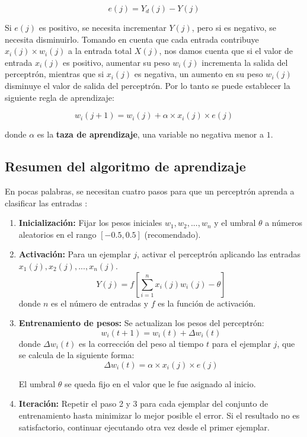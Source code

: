 \[ e(j) = Y_d(j)-Y(j)\]
\parencite[171]{Nengnevitsky2005}

Si $e(j)$ es positivo, se necesita incrementar $Y(j)$, pero si es negativo, se necesita disminuirlo. Tomando en cuenta que cada entrada contribuye \(x_i(j) \times w_i(j)\) a la entrada total $X(j)$, nos damos cuenta que si el valor de entrada $x_i(j)$ es positivo, aumentar su peso $w_i(j)$ incrementa la salida del perceptrón, mientras que si $x_i(j)$ es negativa, un aumento en su peso $w_i(j)$ disminuye el valor de salida del perceptrón. Por lo tanto se puede establecer la siguiente regla de aprendizaje:

\[w_i(j+1) = w_i(j) + \alpha \times x_i(j) \times e(j) \]
\parencite[171]{Nengnevitsky2005}

\noindent donde $\alpha$ es la \textbf{taza de aprendizaje}, una variable no negativa menor a $1$.

\subsection{Resumen del algoritmo de aprendizaje}

\noindent En pocas palabras, se necesitan cuatro pasos para que un perceptrón aprenda a clasificar las entradas \parencite[172]{Nengnevitsky2005}:\par

\begin{enumerate}
  \item \textbf{Inicialización:} Fijar los pesos iniciales \(w_1, w_2, ..., w_n\) y el umbral $\theta$ a números aleatorios en el rango $[-0.5, 0.5]$ (recomendado).
  
  \item \textbf{Activación:} Para un ejemplar $j$, activar el perceptrón aplicando las entradas\\ \(x_1(j), x_2(j), ..., x_n(j)\).
  \[Y(j) = f\left[\sum_{i=1}^{n}x_i(j)w_i(j)-\theta\right]\]
  donde $n$ es el número de entradas y $f$ es la función de activación.
  
  \item \textbf{Entrenamiento de pesos:} Se actualizan los pesos del perceptrón:
  \[w_i(t+1)=w_i(t)+\Delta w_i(t)\]
  donde \(\Delta w_i(t)\) es la corrección del peso al tiempo $t$ para el ejemplar $j$, que se calcula de la siguiente forma:
  \[\Delta w_i(t)=\alpha \times x_i(j) \times e(j)\]
  
  El umbral $\theta$ se queda fijo en el valor que le fue asignado al inicio.
  
  \item \textbf{Iteración:} Repetir el paso 2 y 3 para cada ejemplar del conjunto de entrenamiento hasta minimizar lo mejor posible el error. Si el resultado no es satisfactorio, continuar ejecutando otra vez desde el primer ejemplar.
  \label{algo:b}
\end{enumerate}

